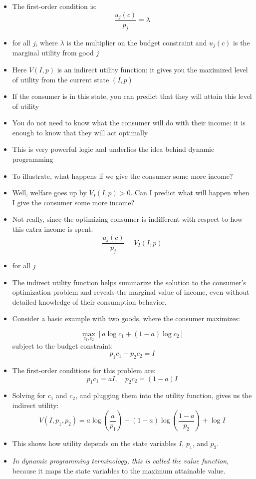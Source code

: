 \documentclass[12pt]{article}
\begin{document}
\begin{itemize}
    \item The first-order condition is:
    \[
    \frac{u_j(c)}{p_j} = \lambda
    \]
    \item for all \( j \), where \( \lambda \) is the multiplier on the budget constraint and \( u_j(c) \) is the marginal utility from good \( j \)
    \item Here \( V(I, p) \) is an indirect utility function: it gives you the maximized level of utility from the current state \( (I, p) \)
    \item If the consumer is in this state, you can predict that they will attain this level of utility
    \item You do not need to know what the consumer will do with their income: it is enough to know that they will act optimally
    \item This is very powerful logic and underlies the idea behind dynamic programming
    \item To illustrate, what happens if we give the consumer some more income?
    \item Well, welfare goes up by \( V_I(I, p) > 0 \). Can I predict what will happen when I give the consumer some more income?
    \item Not really, since the optimizing consumer is indifferent with respect to how this extra income is spent:
    \[
    \frac{u_j(c)}{p_j} = V_I(I, p)
    \]
    \item for all \( j \)
\end{itemize}

\begin{itemize}
    \item The indirect utility function helps summarize the solution to the consumer's optimization problem and reveals the marginal value of income, even without detailed knowledge of their consumption behavior.
    
    \item Consider a basic example with two goods, where the consumer maximizes:
    
    
    \[
    \max_{c_1, c_2} \left[ a \log c_1 + (1 - a) \log c_2 \right]
    \]
    subject to the budget constraint:
    \[
    p_1 c_1 + p_2 c_2 = I
    \]
    
    \item The first-order conditions for this problem are:
    \[
    p_1 c_1 = aI, \quad p_2 c_2 = (1 - a)I
    \]
    
    \item Solving for \( c_1 \) and \( c_2 \), and plugging them into the utility function, gives us the indirect utility:
    \[
    V(I, p_1, p_2) = a \log \left( \frac{a}{p_1} \right) + (1 - a) \log \left( \frac{1 - a}{p_2} \right) + \log I
    \]
    
    \item This shows how utility depends on the state variables \( I \), \( p_1 \), and \( p_2 \). 
    
    \item \textit{In dynamic programming terminology, this is called the value function}, because it maps the state variables to the maximum attainable value.
\end{itemize}
\end{document}
